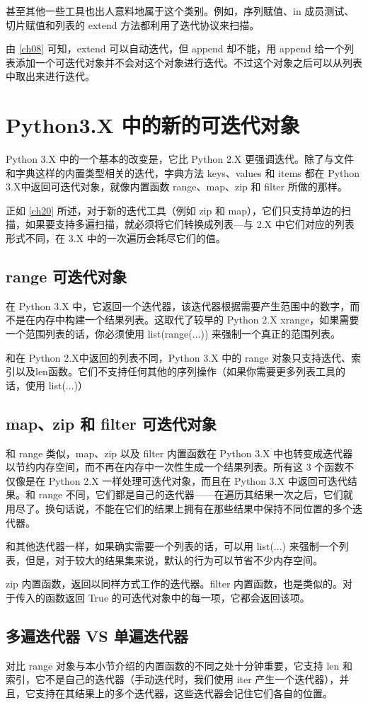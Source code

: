 甚至其他一些工具也出人意料地属于这个类别。例如，序列赋值、in 成员测试、切片赋值和列表的 extend 方法都利用了迭代协议来扫描。

由 \autoref{ch08} 可知，extend 可以自动迭代，但 append 却不能，用 append 给一个列表添加一个可迭代对象并不会对这个对象进行迭代。不过这个对象之后可以从列表中取出来进行迭代。
\section{Python3.X 中的新的可迭代对象}
Python 3.X 中的一个基本的改变是，它比 Python 2.X 更强调迭代。除了与文件和字典这样的内置类型相关的迭代，字典方法 keys、values 和 items 都在 Python 3.X中返回可迭代对象，就像内置函数 range、map、zip 和 filter 所做的那样。

正如 \autoref{ch20} 所述，对于新的迭代工具（例如 zip 和 map），它们只支持单边的扫描，如果要支持多遍扫描，就必须将它们转换成列表---与 2.X 中它们对应的列表形式不同，在 3.X 中的一次遍历会耗尽它们的值。
\subsection{range 可迭代对象}
在 Python 3.X 中，它返回一个迭代器，该迭代器根据需要产生范围中的数字，而不是在内存中构建一个结果列表。这取代了较早的 Python 2.X xrange，如果需要一个范围列表的话，你必须使用 list(range(...)) 来强制一个真正的范围列表。

和在 Python 2.X中返回的列表不同，Python 3.X 中的 range 对象只支持迭代、索引以及len函数。它们不支持任何其他的序列操作（如果你需要更多列表工具的话，使用 list(...)）
\subsection{map、zip 和 filter 可迭代对象}
和 range 类似，map、zip 以及 filter 内置函数在 Python 3.X 中也转变成迭代器以节约内存空间，而不再在内存中一次性生成一个结果列表。所有这 3 个函数不仅像是在 Python 2.X 一样处理可迭代对象，而且在 Python 3.X 中返回可迭代结果。和 range 不同，它们都是自己的迭代器——在遍历其结果一次之后，它们就用尽了。换句话说，不能在它们的结果上拥有在那些结果中保持不同位置的多个迭代器。

和其他迭代器一样，如果确实需要一个列表的话，可以用 list(...) 来强制一个列表，但是，对于较大的结果集来说，默认的行为可以节省不少内存空间。

zip 内置函数，返回以同样方式工作的迭代器。filter 内置函数，也是类似的。对于传入的函数返回 True 的可迭代对象中的每一项，它都会返回该项。
\subsection{多遍迭代器 VS 单遍迭代器}
对比 range 对象与本小节介绍的内置函数的不同之处十分钟重要，它支持 len 和索引，它不是自己的迭代器（手动迭代时，我们使用 iter 产生一个迭代器），并且，它支持在其结果上的多个迭代器，这些迭代器会记住它们各自的位置。

